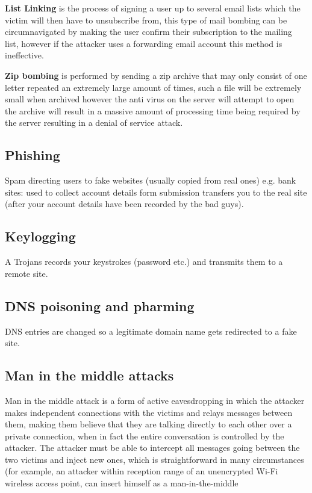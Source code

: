 \documentclass[a4paper,oneside]{report}
\begin{document}
\textbf{List Linking} is the process of signing a user up to several email lists which the victim will then have to unsubscribe from, this type of mail bombing can be circumnavigated by making the user confirm their subscription to the mailing list, however if the attacker uses a forwarding email account this method is ineffective. 

\textbf{Zip bombing} is performed by sending a zip archive that may only consist of one letter repeated an extremely large amount of times, such a file will be extremely small when archived however the anti virus on the server will attempt to open the archive will result in a massive amount of processing time being required by the server resulting in a denial of service attack. 


	    	\subsection{Phishing}
		Spam directing users to fake websites (usually copied from real ones) e.g. bank sites: used to collect account details form submission transfers you to the real site (after your account details have been recorded by the bad guys).


	    	\subsection{Keylogging}
  		 A Trojans records your keystrokes (password etc.) and transmits them to a remote site.

		\subsection{DNS poisoning and pharming}
		DNS entries are changed so a legitimate domain name gets redirected to a fake site.

		\subsection{Man in the middle attacks}
Man in the middle attack is a form of active eavesdropping in which the attacker makes independent connections with the victims and relays messages between them, making them believe that they are talking directly to each other over a private connection, when in fact the entire conversation is controlled by the attacker. The attacker must be able to intercept all messages going between the two victims and inject new ones, which is straightforward in many circumstances (for example, an attacker within reception range of an unencrypted Wi-Fi wireless access point, can insert himself as a man-in-the-middle
\end{document}
